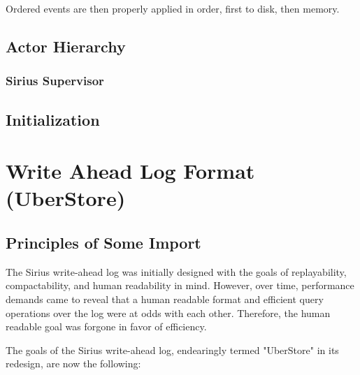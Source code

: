 \documentclass[11pt]{article}
\begin{document}
Ordered events are then properly applied in order, first to disk, then memory.

\subsection{Actor Hierarchy}

\subsubsection{Sirius Supervisor}

\subsection{Initialization}

\section{Write Ahead Log Format (UberStore)}

\subsection{Principles of Some Import}
The Sirius write-ahead log was initially designed with the goals of replayability,
compactability, and human readability in mind. However, over time, performance demands
came to reveal that a human readable format and efficient query operations over the
log were at odds with each other.  Therefore, the human readable goal was forgone
in favor of efficiency.

The goals of the Sirius write-ahead log, endearingly termed "UberStore" in its redesign,
are now the following:
\end{document}
